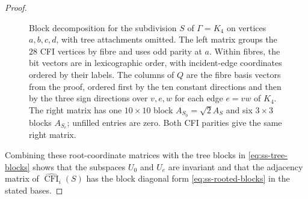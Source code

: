 \documentclass[11pt,a4paper]{article}
\theoremstyle{plain}
\theoremstyle{definition}
\DeclareMathOperator{\CFI}{CFI}
\begin{document}
\begin{proof}
\begin{figure}[tb]
\caption{Block decomposition for the subdivision $S$ of $\Gamma=K_4$
on vertices $a,b,c,d$, with tree attachments omitted.
The left matrix groups the $28$ CFI vertices by fibre and uses odd parity
at $a$. Within fibres, the bit vectors are in lexicographic order,
with incident-edge coordinates ordered by their labels.
The columns of $Q$ are the fibre basis vectors from the proof, ordered
first by the ten constant directions and then by the three sign directions
over $v,e,w$ for each edge $e=vw$ of $K_4$.
The right matrix has one $10\times10$ block $A_{S_0}=\sqrt2 A_S$ and
six $3\times3$ blocks $A_{S_e}$; unfilled entries are zero.
Both CFI parities give the same right matrix.}
\label{fig:ss-cfi-blocks}
\end{figure}

Combining these root-coordinate matrices with the tree blocks in
\cref{eq:ss-tree-blocks} shows that the subspaces $U_0$ and $U_e$
are invariant and that the adjacency matrix of $\widehat{\CFI}_i(S)$ has the block diagonal form
\cref{eq:ss-rooted-blocks} in the stated bases.
\end{proof}
\end{document}
